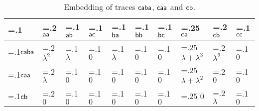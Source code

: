\begin{table*}[t!]
	\vspace{+0.7cm}
	\caption{Embedding of traces $\mathsf{caba}$, $\mathsf{caa}$ and $\mathsf{cb}$.}\label{tb:embedding}
	\vspace{-0.4cm}
	\begin{center}
		{
			\begin{tabularx}{\textwidth}{
					>{\hsize=.1\hsize}X
					>{\hsize=.2\hsize}X
					>{\hsize=.1\hsize}X
					>{\hsize=.1\hsize}X
					>{\hsize=.1\hsize}X
					>{\hsize=.1\hsize}X
					>{\hsize=.1\hsize}X
					>{\hsize=.25\hsize}X
					>{\hsize=.2\hsize}X
					>{\hsize=.1\hsize}X
				}
				\toprule
				& $\mathsf{aa}$    & $\mathsf{ab}$   & $\mathsf{ac}$    & $\mathsf{ba}$   & $\mathsf{bb}$   & $\mathsf{bc}$ & $\mathsf{ca}$ & $\mathsf{cb}$ & $\mathsf{cc}$   \\
				\midrule
				$\mathsf{caba}$ & $\lambda^2$ & $\lambda$ & $0$ & $\lambda$  & $0$  & $0$ & $\lambda+\lambda^3$ & $\lambda^2$ & $0$\\
				$\mathsf{caa}$  & $\lambda$ & $0$ & $0$ & $0$ & $0$ & $0$ & $\lambda+\lambda^2$ & $0$&  $0$\\
				$\mathsf{cb}$   & $0$ & $0$ & $0$ & $0$ & $0$ & $0$ & $0$ & $\lambda$& $0$ \\
				\bottomrule
			\end{tabularx}
		}
		\vspace{-0.3cm}
	\end{center}
\end{table*}
